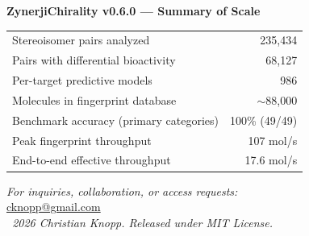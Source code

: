 \documentclass[11pt,a4paper]{article}
\begin{document}
\begin{keyresult}
\centering
\textbf{ZynerjiChirality v0.6.0 --- Summary of Scale}\\[6pt]
\begin{tabular}{lr}
Stereoisomer pairs analyzed & 235,434 \\
Pairs with differential bioactivity & 68,127 \\
Per-target predictive models & 986 \\
Molecules in fingerprint database & $\sim$88,000 \\
Benchmark accuracy (primary categories) & 100\% (49/49) \\
Peak fingerprint throughput & 107 mol/s \\
End-to-end effective throughput & 17.6 mol/s \\
\end{tabular}
\end{keyresult}

\vspace{0.5cm}

\begin{center}
\small\color{gray}
\textit{For inquiries, collaboration, or access requests:}\\
\href{mailto:cknopp@gmail.com}{cknopp@gmail.com}\\[4pt]
\textit{\textcopyright\ 2026 Christian Knopp. Released under MIT License.}
\end{center}

\newpage
\end{document}
